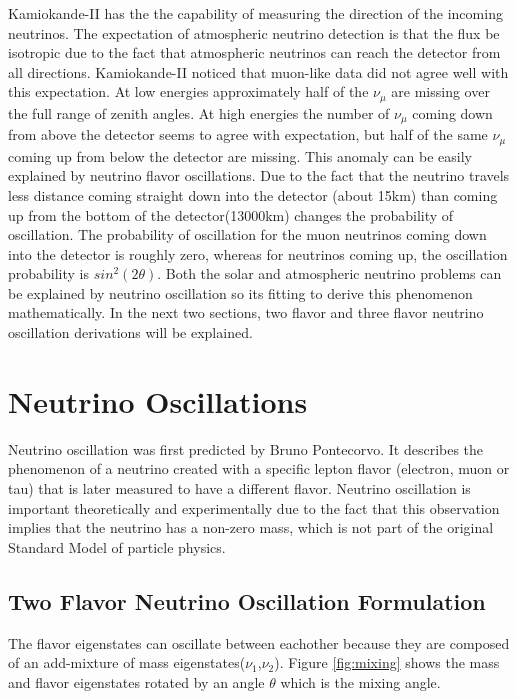 Kamiokande-II has the the capability of measuring the direction of the incoming neutrinos. The expectation of atmospheric neutrino detection is that the flux be isotropic due to the fact that atmospheric neutrinos can reach the detector from all directions. Kamiokande-II noticed that muon-like data did not agree well with this expectation. At low energies approximately half of the $\nu_{\mu}$ are missing over the full range of zenith angles. At high energies the number of $\nu_{\mu}$ coming down from above the detector seems to agree with expectation, but half of the same $\nu_{\mu}$ coming up from below the detector are missing. This anomaly can be easily explained by neutrino flavor oscillations. Due to the fact that the neutrino travels less distance coming straight down into the detector (about 15km) than coming up from the bottom of the detector(13000km) changes the probability of oscillation. The probability of oscillation for the muon neutrinos coming down into the detector is roughly zero, whereas for neutrinos coming up, the oscillation probability is $sin^2(2\theta)$. Both the solar and atmospheric neutrino problems can be explained by neutrino oscillation so its fitting to derive this phenomenon mathematically. In the next two sections, two flavor and three flavor neutrino oscillation derivations will be explained. 



\section{Neutrino Oscillations}
Neutrino oscillation was first predicted by Bruno Pontecorvo. It describes the phenomenon of a neutrino created with a specific lepton flavor (electron, muon or tau) that is later measured to have a different flavor. Neutrino oscillation is important theoretically and experimentally due to the fact that this observation implies that the neutrino has a non-zero mass, which is not part of the original Standard Model of particle physics. \cite{neutrinooscillation} 

\subsection{Two Flavor Neutrino Oscillation Formulation}
The flavor eigenstates can oscillate between eachother because they are composed of an add-mixture of mass eigenstates($\nu_{1}$,$\nu_{2}$). Figure \ref{fig:mixing} shows the mass and flavor eigenstates rotated by an angle $\theta$ which is the mixing angle. 

